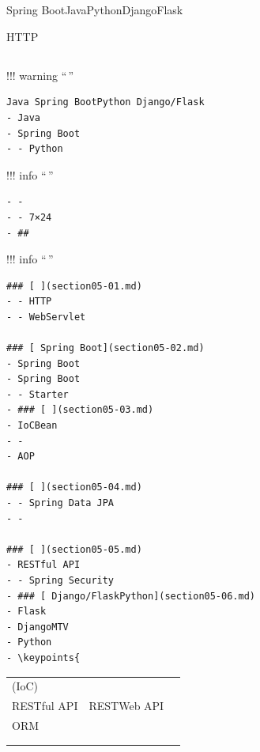 \hypertarget{section}{%
\section{}\label{section}}


\hypertarget{section-1}{%
\subsection{}\label{section-1}}

Spring BootJavaPythonDjangoFlask

HTTP

\hypertarget{section-2}{%
\subsection{}\label{section-2}}

!!! warning ``\,''

\begin{verbatim}
Java Spring BootPython Django/Flask
- Java
- Spring Boot
- - Python
\end{verbatim}

!!! info ``\,''

\begin{verbatim}
- - 
- - 7×24
- ## 
\end{verbatim}

!!! info ``\,''

\begin{verbatim}
### [ ](section05-01.md)
- - HTTP
- - WebServlet

### [ Spring Boot](section05-02.md)
- Spring Boot
- Spring Boot
- - Starter
- ### [ ](section05-03.md)
- IoCBean
- - 
- AOP

### [ ](section05-04.md)
- - Spring Data JPA
- - 

### [ ](section05-05.md)
- RESTful API
- - Spring Security
- ### [ Django/FlaskPython](section05-06.md)
- Flask
- DjangoMTV
- Python
- \keypoints{
\end{verbatim}

\begin{longtable}[]{@{}lll@{}}
\toprule\noalign{}
\endhead
\bottomrule\noalign{}
\endlastfoot
(IoC) & & \\
RESTful API & RESTWeb API & \\
ORM & & \\
& & \\
& & \\
\end{longtable}


